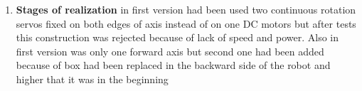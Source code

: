 \begin{enumerate}
  \item
    \textbf{Stages of realization}
      in first version had been used two continuous rotation servos fixed on both edges of axis instead of on one DC motors but after tests this construction was rejected because of lack 
      of speed and power. Also in first version was only one forward axis but second one had been added because of box had been replaced in the backward side of the robot and higher that 
      it was in the beginning  
\end{enumerate}

\fillpage